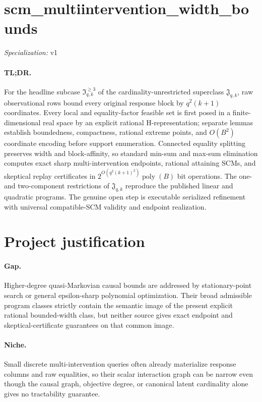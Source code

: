 \documentclass{article}
\begin{document}
\sloppy

\section*{scm\_\allowbreak{}multiintervention\_\allowbreak{}width\_\allowbreak{}bounds}

\noindent\textit{Specialization:} v1\par

\paragraph{TL;DR.} For the headline subcase \(\mathfrak I_{q,k}^{\ge3}\) of the cardinality-unrestricted superclass \(\mathfrak J_{q,k}\), raw observational rows bound every original response block by \(q^2(k+1)\) coordinates. Every local and equality-factor feasible set is first posed in a finite-dimensional real space by an explicit rational H-representation; separate lemmas establish boundedness, compactness, rational extreme points, and \(O(B^2)\) coordinate encoding before support enumeration. Connected equality splitting preserves width and block-affinity, so standard min-sum and max-sum elimination computes exact sharp multi-intervention endpoints, rational attaining SCMs, and skeptical replay certificates in \(2^{O(q^2(k+1)^2)}\operatorname{poly}(B)\) bit operations. The one- and two-component restrictions of \(\mathfrak J_{q,k}\) reproduce the published linear and quadratic programs. The genuine open step is executable serialized refinement with universal compatible-SCM validity and endpoint realization.

\section{Project justification}

\paragraph{Gap.} Higher-degree quasi-Markovian causal bounds are addressed by stationary-point search or general epsilon-sharp polynomial optimization. Their broad admissible program classes strictly contain the semantic image of the present explicit rational bounded-width class, but neither source gives exact endpoint and skeptical-certificate guarantees on that common image.

\paragraph{Niche.} Small discrete multi-intervention queries often already materialize response columns and raw equalities, so their scalar interaction graph can be narrow even though the causal graph, objective degree, or canonical latent cardinality alone gives no tractability guarantee.
\end{document}
